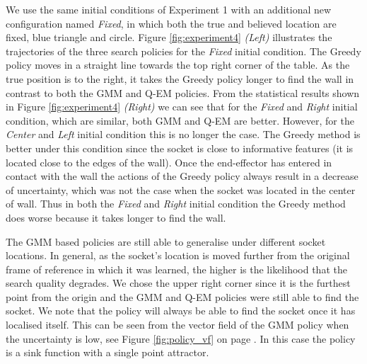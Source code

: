 \documentclass[final,3p,times,twocolumn]{elsarticle}
\begin{document}

We use the same initial conditions of Experiment 1 with an additional 
new configuration named \textit{Fixed}, in which both the true and believed location are fixed, blue triangle and circle.
Figure \ref{fig:experiment4} \textit{(Left)} illustrates the trajectories of the three search policies for the \textit{Fixed} initial condition. 
The Greedy policy moves in a straight line towards the top
right corner of the table. As the true position is to the right, it takes the Greedy policy longer to find the wall 
in contrast to both the GMM and Q-EM policies. From the statistical results shown in Figure \ref{fig:experiment4} \textit{(Right)} we can see
that for the \textit{Fixed} and \textit{Right} initial condition, which are similar, both GMM and Q-EM are better. However, for 
the \textit{Center} and \textit{Left} initial condition this is no longer the case. 
The Greedy method is better under this condition since the socket is close to informative features (it is located close to the edges of the wall). 
Once the end-effector has entered in contact with the wall the actions of the Greedy policy always result in a decrease of uncertainty, which was not the case when the socket was located in the center of wall. 
Thus in both the \textit{Fixed} and \textit{Right} initial condition the Greedy method does worse because it takes longer
to find the wall.

The GMM based policies are still able to generalise under different socket locations. In general, as the socket's location is moved 
further from the original frame of reference in which it was learned, the higher is the likelihood that the search quality degrades. We 
chose the upper right corner since it is the furthest point from the origin and the GMM and Q-EM policies were still able to find 
the socket. We note that the policy will always be able to find the socket once it has localised itself. This can be seen from the vector field 
of the GMM policy when the uncertainty is low, see Figure \ref{fig:policy_vf} on page \pageref{fig:policy_vf}. In this case the policy is a sink function 
with a single point attractor.
\end{document}
